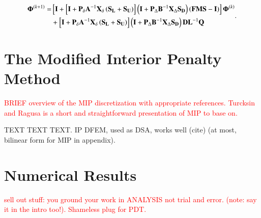 \documentclass[preprint,10pt]{elsarticle}
\newcommand{\tcr}[1]{\textcolor{red}{#1}}
\begin{document}
\begin{equation}
\label{eq::DSA_MG_Summary_TG_Jac}
\begin{aligned}
{\bf \Phi}^{(k+1)} = & \left[ {\bf I} +\left[ {\bf I}+ {\bf P}_{\delta}{\bf A}^{-1}  {\bf X}_{\delta}\left(   {\bf S_L} +  {\bf S_U} \right) \right]    \left(  {\bf I} + {\bf P}_{\Delta} {\bf B}^{-1} {\bf X}_{\Delta} {\bf S_D} \right) \left(   {\bf F}  {\bf M} {\bf S}  - {\bf I} \right)   \right]{\bf \Phi}^{(k)} \\
&+  \left[ {\bf I}+ {\bf P}_{\delta}{\bf A}^{-1}  {\bf X}_{\delta}\left(   {\bf S_L} +  {\bf S_U} \right) \right]  \left(  {\bf I} + {\bf P}_{\Delta} {\bf B}^{-1} {\bf X}_{\Delta} {\bf S_D} \right) {\bf D} {\bf L}^{-1} {\bf Q} \\
\end{aligned} .
\end{equation}

\section{The Modified Interior Penalty Method} \label{sec::MIP}

\tcr{BRIEF overview of the MIP discretization with appropriate references. Turcksin and Ragusa is a short and straightforward presentation of MIP to base on.}

TEXT TEXT TEXT. IP DFEM, used as DSA, works well (cite) (at most, bilinear form for MIP in appendix).

\section{Numerical Results} \label{sec::results}
\tcr{sell out stuff: you ground your work in ANALYSIS not trial and error. (note: say it in the intro too!). Shameless plug for PDT.}

\end{document}
